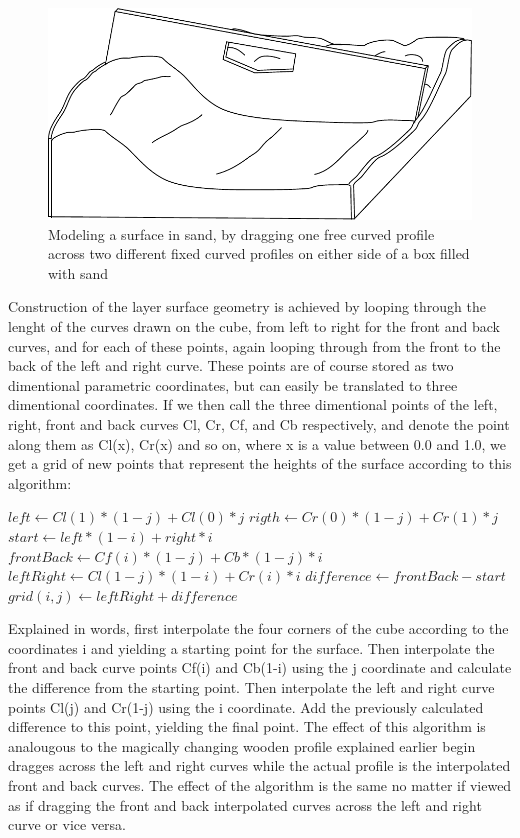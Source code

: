 \documentclass[a4paper,12pt]{article}
\begin{document}
\begin{figure}
 \includegraphics[width=\linewidth]{thesis/sandbox.pdf}
 \caption{Modeling a surface in sand, by dragging one free curved profile across two different fixed curved profiles on either side of a box filled with sand}
 \label{fig:wooden}
\end{figure}


Construction of the layer surface geometry is achieved by looping through the lenght of the curves drawn on the cube, from left to right for the front and back curves, and for each of these points, again looping through from the front to the back of the left and right curve. These points are of course stored as two dimentional parametric coordinates, but can easily be translated to three dimentional coordinates. If we then call the three dimentional points of the left, right, front and back curves Cl, Cr, Cf, and Cb respectively, and denote the point along them as Cl(x), Cr(x) and so on, where x is a value between 0.0 and 1.0, we get a grid of new points that represent the heights of the surface according to this algorithm:

\begin{algorithm}
\begin{algorithmic}
  \State $left \gets Cl(1)*(1-j) + Cl(0)*j$
  \State $rigth \gets Cr(0)*(1-j) + Cr(1)*j$
  \State $start \gets left*(1-i) + right*i$
  \State $frontBack \gets Cf(i)*(1-j) + Cb*(1-j)*i$
  \State $leftRight \gets Cl(1-j)*(1-i) + Cr(i)*i$
  \State $difference \gets frontBack - start$
  \State $grid(i,j) \gets leftRight + difference$
\EndFor
\end{algorithmic}
\end{algorithm}

Explained in words, first interpolate the four corners of the cube according to the coordinates i and yielding a starting point for the surface. Then interpolate the front and back curve points Cf(i) and Cb(1-i) using the j coordinate and calculate the difference from the starting point. Then interpolate the left and right curve points Cl(j) and Cr(1-j) using the i coordinate. Add the previously calculated difference to this point, yielding the final point. The effect of this algorithm is analougous to the magically changing wooden profile explained earlier begin dragges across the left and right curves while the actual profile is the interpolated front and back curves. The effect of the algorithm is the same no matter if viewed as if dragging the front and back interpolated curves across the left and right curve or vice versa.
\end{document}
